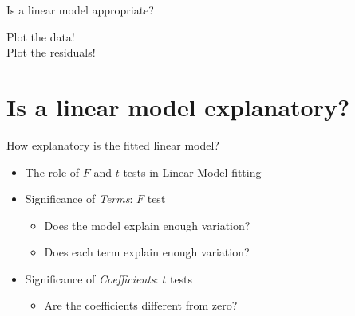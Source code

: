 \documentclass[xcolor=x11names,compress]{beamer}
\renewcommand{\(}{\begin{columns}}
\renewcommand{\)}{\end{columns}}
\newcommand{\<}[1]{\begin{column}{#1}}
\renewcommand{\>}{\end{column}}
\begin{document}

\begin{frame}{Is a linear model appropriate?}

\begin{center} 
    \Huge
Plot the data!\\
Plot the residuals!
\end{center}

\end{frame}


\section{Is a linear model explanatory?}

\begin{frame}{How explanatory is the fitted linear model?}

\begin{center}
\begin{itemize}[<+->]\itemsep20pt
\item The role of $F$ and $t$ tests in Linear Model fitting
\item Significance of {\it Terms}: $F$ test
\begin{itemize}
    \item Does the model explain enough variation?
    \item Does each term explain enough variation?
\end{itemize}
\item Significance of {\it Coefficients}: $t$ tests
\begin{itemize}
    \item Are the coefficients different from zero?
\end{itemize}
\end{itemize}

\end{center}
\end{frame}

\end{document}
